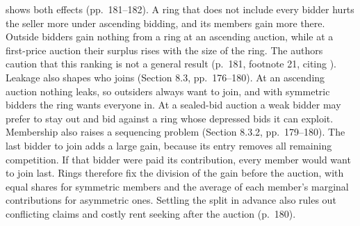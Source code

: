  shows both effects (pp.~181--182). A ring that does not include every bidder hurts the
seller more under ascending bidding, and its members gain more there. Outside bidders gain nothing from a
ring at an ascending auction, while at a first-price auction their surplus rises with the size of the ring.
The authors caution that this ranking is not a general result (p.~181, footnote 21, citing
\citealp{MaskinRiley2000}). Leakage also shapes who joins (Section 8.3, pp.~176--180). At an ascending
auction nothing leaks, so outsiders always want to join, and with symmetric bidders the ring wants everyone
in. At a sealed-bid auction a weak bidder may prefer to stay out and bid against a ring whose depressed bids
it can exploit. Membership also raises a sequencing problem (Section 8.3.2, pp.~179--180). The last bidder
to join adds a large gain, because its entry removes all remaining competition. If that bidder were paid its
contribution, every member would want to join last. Rings therefore fix the division of the gain before the
auction, with equal shares for symmetric members and the average of each member's marginal contributions
for asymmetric ones. Settling the split in advance also rules out conflicting claims and costly rent
seeking after the auction (p.~180).

